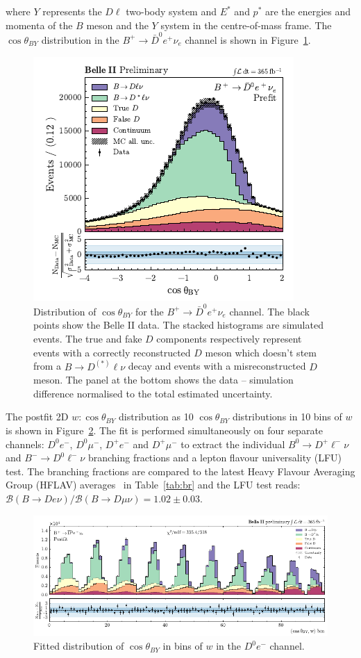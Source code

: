 \documentclass{moriond}
\def\costby{\cos\theta_{BY}}
\begin{document}
where $Y$ represents the $D\ell$ two-body system and $E^*$ and $p^*$ are the energies and momenta of the $B$ meson and the $Y$ system in the centre-of-mass frame. The $\costby$ distribution in the $B^+ \to \bar{D}^0e^+\nu_e$ channel is shown in Figure~\ref{fig:cos_theta_BY}.
\begin{figure}[h!]
    \centering
    \includegraphics[scale=1.1]{cos_theta_BY.pdf}
    \caption{Distribution of $\costby$ for the $B^+ \to \bar{D}^0e^+\nu_e$ channel. The black points show the Belle II data. The stacked histograms are simulated events. The true and fake $D$ components respectively represent events with a correctly reconstructed $D$ meson which doesn't stem from a $B \to D^{(*)} \ell \nu$ decay and events with a misreconstructed $D$ meson. The panel at the bottom shows the data -- simulation difference normalised to the total estimated uncertainty.}
    \label{fig:cos_theta_BY}
\end{figure}
The postfit 2D $w:\costby$ distribution as 10 $\costby$ distributions in 10 bins of $w$ is shown in Figure~\ref{fig:2d_fit}. The fit is performed simultaneously on four separate channels: $D^0e^-$, $D^0\mu^-$, $D^+e^-$ and $D^+\mu^-$ to extract the individual $B^0 \to D^+\ell^-\nu$ and $B^- \to D^0\ell^-\nu$ branching fractions and a lepton flavour universality (LFU) test. The branching fractions are compared to the latest Heavy Flavour Averaging Group (HFLAV) averages~\cite{hflav} in Table~\ref{tab:br} and the LFU test reads: $\mathcal{B}(B \to D e \nu) / \mathcal{B}(B \to D \mu \nu) = 1.02 \pm 0.03$.
\begin{figure}[h!]
    \centering
    \includegraphics[scale=1.1]{2d_fit.pdf}
    \caption{Fitted distribution of $\costby$ in bins of $w$ in the $D^0e^-$ channel.}
    \label{fig:2d_fit}
\end{figure}
\end{document}

